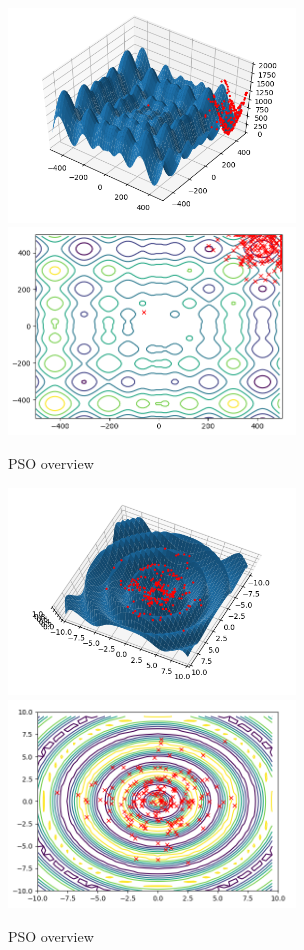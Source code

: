 \documentclass[journal]{IEEEtran}
\begin{document}
\begin{figure}
\centering
\includegraphics[width=3.0in]{_img/img_PSO_test_2d_schwefel_3dview.png}
\includegraphics[width=3.0in]{_img/img_PSO_test_2d_schwefel_contours.png}
\caption{PSO overview}
\end{figure}

\begin{figure}
\centering
\includegraphics[width=3.0in]{_img/img_PSO_test_2d_schafferfcn6_3dview.png}
\includegraphics[width=3.0in]{_img/img_PSO_test_2d_schafferfcn6_contours.png}
\caption{PSO overview}
\end{figure}
\end{document}
